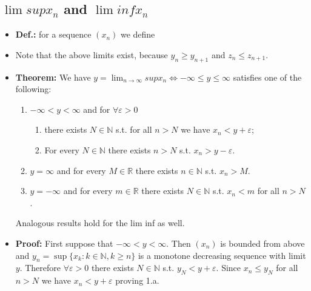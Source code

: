 \documentclass{article}
\begin{document}
\subsection{\texorpdfstring{$\lim sup x_n$ and $\lim inf x_{n}$}{lim sup xn and lim inf xn}}
\begin{itemize}
    \item \textbf{Def.:} for a sequence $(x_n)$ we define
    \item Note that the above limits exist, because $y_n \ge y_{n+1}$ and $z_n \le z_{n+1}$.
    \item \textbf{Theorem:} We have $\displaystyle y = \lim_{n\to\infty} sup x_n \iff -\infty \leq y \leq \infty$ satisfies one of the following: 
    \begin{enumerate}
        \item $-\infty < y < \infty$ and for $\forall \varepsilon > 0$
        \begin{enumerate}[label=(\alph*)]
            \item there exists $N \in \mathbb{N}$ s.t. for all $n > N$ we have $x_n < y + \varepsilon$; 
            \item For every $N \in \mathbb{N}$ there exists $n > N$ s.t. $x_n > y - \varepsilon$. 
        \end{enumerate}
        \item $y = \infty$ and for every $M \in \mathbb{R}$ there exists $n \in \mathbb{N}$ s.t. $x_n > M$. 
        \item $y = -\infty$ and for every $m \in \mathbb{R}$ there exists $N \in \mathbb{N}$ s.t. $x_n < m$ for all $n > N$. 
    \end{enumerate}
    Analogous results hold for the lim inf as well.
    \item \textbf{Proof:} First suppose that $-\infty < y < \infty$. Then $(x_n)$ is bounded from above and $y_n = \sup\{x_k: k \in \mathbb{N}, k \ge n\}$ is a monotone decreasing sequence with limit $y$. Therefore $\forall \varepsilon > 0$ there exists $N \in \mathbb{N}$ s.t. $y_N < y + \varepsilon$. Since $x_n \le y_N$ for all $n > N$ we have $x_n < y + \varepsilon$ proving 1.a. 
    

\end{itemize}
\end{document}
